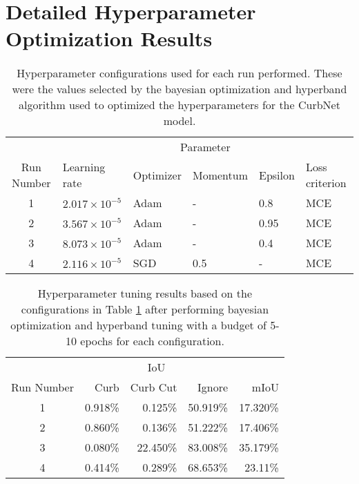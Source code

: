 \section{Detailed Hyperparameter Optimization Results}\label{appendix:hpoptimresults}

\begin{table}[h!]
	\centering
	\begin{tabular}{@{}clllll@{}}
		\toprule
		& \multicolumn{5}{c}{Parameter} \\\cmidrule(lr){2-6}
		Run Number & Learning rate & Optimizer & Momentum & Epsilon & Loss criterion \\ \midrule
		1 & $2.017 \times 10^{-5}$ & Adam & - & 0.8 & MCE \\
		2 & $3.567 \times 10^{-5}$ & Adam & - & 0.95 & MCE \\
		3 & $8.073 \times 10^{-5}$ & Adam & - & 0.4 & MCE \\
		4 & $2.116 \times 10^{-5}$ & SGD & 0.5 & - & MCE \\ \bottomrule
	\end{tabular}
	\caption[Hyperparameter Tuning Configurations]{Hyperparameter configurations used for each run performed. These were the values selected by the bayesian optimization and hyperband algorithm used to optimized the hyperparameters for the CurbNet model.}
	\label{tab:appendix-hpoptimconfig}
\end{table}

\begin{table}[h!]
	\centering
	\begin{tabular}{@{}crrrr@{}}
		\cmidrule(r){1-4}
		& \multicolumn{3}{c}{IoU} &  \\ \cmidrule(lr){2-4}
		Run Number & Curb & Curb Cut & Ignore & mIoU \\ \midrule
		1 & 0.918\% & 0.125\% & 50.919\% & 17.320\% \\
		2 & 0.860\% & 0.136\% & 51.222\% & 17.406\% \\
		3 & 0.080\% & 22.450\% & 83.008\% & 35.179\% \\
		4 & 0.414\% & 0.289\% & 68.653\% & 23.11\% \\ \bottomrule
	\end{tabular}
	\caption[Hyperparameter Tuning Results]{Hyperparameter tuning results based on the configurations in Table \ref{tab:appendix-hpoptimconfig} after performing bayesian optimization and hyperband tuning with a budget of 5-10 epochs for each configuration.}
	\label{tab:appendix-hpoptimresults}
\end{table}